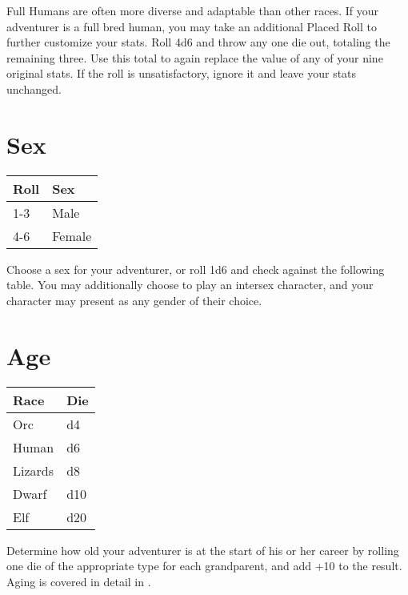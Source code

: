 Full Humans are often more diverse and adaptable than other races. If your adventurer is a full bred human, you may take an additional Placed Roll to further customize your stats. Roll 4d6 and throw any one die out, totaling the remaining three. Use this total to again replace the value of any of your nine original stats. If the roll is unsatisfactory, ignore it and leave your stats unchanged.
\section{Sex}


\begin{normbox}

\small
\begin{tabular}{@{}l l}
\textbf{Roll} & \textbf{Sex}\\
\midrule
1-3 & Male\\
4-6 & Female
\end{tabular}
\end{normbox}
Choose a sex for your adventurer, or roll 1d6 and check against the following table. You may additionally choose to play an intersex character, and your character may present as any gender of their choice.
\section{Age}


\begin{normbox}
\small

\begin{tabular}{@{}l l}
\textbf{Race} & \textbf{Die}\\
\midrule
Orc & d4\\
Human & d6\\
Lizards &  d8\\
Dwarf & d10\\
Elf &  d20\\
\end{tabular}
\normalsize
\end{normbox}

Determine how old your adventurer is at the start of his or her career by rolling one die of the appropriate type for each grandparent, and add +10 to the result. Aging is covered in detail in .

